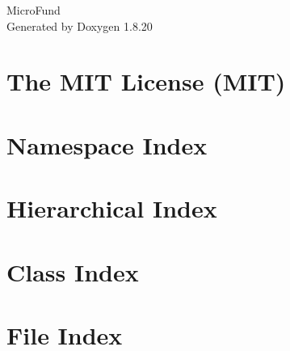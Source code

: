 \let\mypdfximage\pdfximage\def\pdfximage{\immediate\mypdfximage}\documentclass[twoside]{book}
\newcommand{\+}{\discretionary{\mbox{\scriptsize$\hookleftarrow$}}{}{}}
\newcommand{\clearemptydoublepage}{%
  \newpage{\pagestyle{empty}\cleardoublepage}%
}
\begin{document}
\hypersetup{pageanchor=false,
             bookmarksnumbered=true,
             pdfencoding=unicode
            }
\begin{titlepage}
\vspace*{7cm}
\begin{center}%
{\Large Micro\+Fund }\\
\vspace*{1cm}
{\large Generated by Doxygen 1.8.20}\\
\end{center}
\end{titlepage}
\clearemptydoublepage
{}
\tableofcontents
\clearemptydoublepage
{}
\hypersetup{pageanchor=true}

\chapter{The M\+IT License (M\+IT)}
\label{md__c___users__gradn__one_drive__c_s_4790__micro_fund_w_s_u__micro_fund__micro_fund_wwwroot_lib_e270fb65622349addf2e3b66b1459608}

\chapter{Namespace Index}

\chapter{Hierarchical Index}

\chapter{Class Index}

\chapter{File Index}

\end{document}
